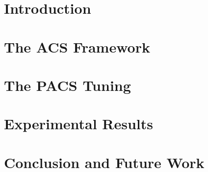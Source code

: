 \afterpage{\blankpage}

\clearpage{\pagestyle{plain}\cleardoublepage}
\tableofcontents

\afterpage{\blankpage}

\clearpage{\pagestyle{plain}\cleardoublepage}

\clearpage{\pagestyle{plain}\cleardoublepage}
\chapter{Introduction}

\clearpage\null\newpage

\clearpage{\pagestyle{plain}\cleardoublepage}
\chapter{The ACS Framework}

\clearpage\null\newpage

\clearpage{\pagestyle{plain}\cleardoublepage}
\chapter{The PACS Tuning}

\clearpage\null\newpage

\clearpage{\pagestyle{plain}\cleardoublepage}
\chapter{Experimental Results}

\clearpage\null\newpage

\clearpage{\pagestyle{plain}\cleardoublepage}
\chapter{Conclusion and Future Work}

\clearpage\null\newpage

\printbibliography[nottype=online]

